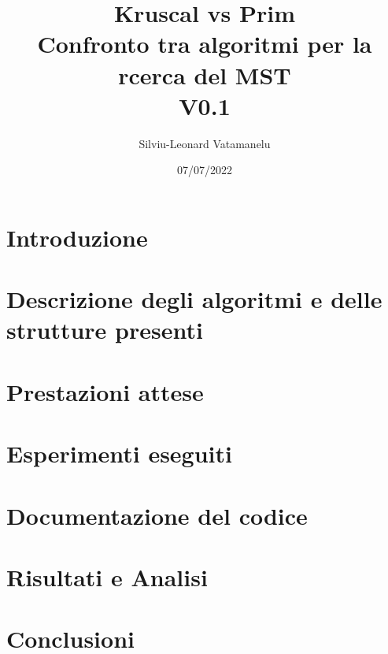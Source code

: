 \documentclass[11pt]{article}
\title{%
    Kruscal vs Prim \\
    \large Confronto tra algoritmi per la rcerca del MST \\
    \small V0.1}
\author{ Silviu-Leonard Vatamanelu }
\date{07/07/2022}
\begin{document}
\maketitle	
\pagebreak

\tableofcontents
\pagebreak

\section{Introduzione}

\pagebreak

\section{Descrizione degli algoritmi e delle strutture presenti}

\pagebreak

\section{Prestazioni attese}

\pagebreak

\section{Esperimenti eseguiti}

\pagebreak

\section{Documentazione del codice}

\pagebreak

\section{Risultati e Analisi}

\pagebreak

\section{Conclusioni}

\pagebreak
\end{document}
